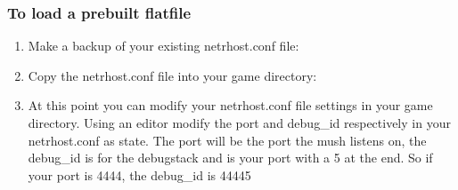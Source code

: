 \documentclass[letterpaper,10pt,english]{sphinxmanual}
\begin{document}
\subsubsection{To load a prebuilt flatfile}
\label{\detokenize{install:to-load-a-prebuilt-flatfile}}\begin{enumerate}
%
\item {} 
\sphinxAtStartPar
Make a backup of your existing netrhost.conf file:

\begin{sphinxVerbatim}[commandchars=\\\{\}]
  
\end{sphinxVerbatim}

\item {} 
\sphinxAtStartPar
Copy the netrhost.conf file into your game directory:

\begin{sphinxVerbatim}[commandchars=\\\{\}]
   
\end{sphinxVerbatim}

\item {} 
\sphinxAtStartPar
At this point you can modify your netrhost.conf file settings in your game directory.
Using an editor modify the \textquotesingle{}port\textquotesingle{} and \textquotesingle{}debug\_id\textquotesingle{} respectively in your netrhost.conf as state.
The \textquotesingle{}port\textquotesingle{} will be the port the mush listens on, the debug\_id is for the debug\sphinxhyphen{}stack and is
your port with a \textquotesingle{}5\textquotesingle{} at the end.  So if your port is 4444, the debug\_id is 44445

\end{enumerate}
\end{document}
